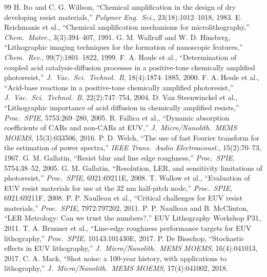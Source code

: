 \documentclass[11pt]{article}
\begin{document}
\begin{thebibliography}{99}
 H. Ito and C. G. Willson, ``Chemical amplification in the design of dry developing resist materials,'' \emph{Polymer Eng.\ Sci.}, 23(18):1012--1018, 1983.
 E. Reichmanis et al., ``Chemical amplification mechanisms for microlithography,'' \emph{Chem.\ Mater.}, 3(3):394--407, 1991.
 G. M. Wallraff and W. D. Hinsberg, ``Lithographic imaging techniques for the formation of nanoscopic features,'' \emph{Chem.\ Rev.}, 99(7):1801--1822, 1999.
 F. A. Houle et al., ``Determination of coupled acid catalysis-diffusion processes in a positive-tone chemically amplified photoresist,'' \emph{J.\ Vac.\ Sci.\ Technol.\ B}, 18(4):1874--1885, 2000.
 F. A. Houle et al., ``Acid-base reactions in a positive-tone chemically amplified photoresist,'' \emph{J.\ Vac.\ Sci.\ Technol.\ B}, 22(2):747--754, 2004.
 D. Van Steenwinckel et al., ``Lithographic importance of acid diffusion in chemically amplified resists,'' \emph{Proc.\ SPIE}, 5753:269--280, 2005.
 R. Fallica et al., ``Dynamic absorption coefficients of CARs and non-CARs at EUV,'' \emph{J.\ Micro/Nanolith.\ MEMS MOEMS}, 15(3):033506, 2016.
 P. D. Welch, ``The use of fast Fourier transform for the estimation of power spectra,'' \emph{IEEE Trans.\ Audio Electroacoust.}, 15(2):70--73, 1967.
 G. M. Gallatin, ``Resist blur and line edge roughness,'' \emph{Proc.\ SPIE}, 5754:38--52, 2005.
 G. M. Gallatin, ``Resolution, LER, and sensitivity limitations of photoresist,'' \emph{Proc.\ SPIE}, 6921:69211E, 2008.
 T. Wallow et al., ``Evaluation of EUV resist materials for use at the 32 nm half-pitch node,'' \emph{Proc.\ SPIE}, 6921:69211F, 2008.
 P. P. Naulleau et al., ``Critical challenges for EUV resist materials,'' \emph{Proc.\ SPIE}, 7972:797202, 2011.
 P. P. Naulleau and B. McClinton, ``LER Metrology: Can we trust the numbers?,'' EUV Lithography Workshop P31, 2011.
 T. A. Brunner et al., ``Line-edge roughness performance targets for EUV lithography,'' \emph{Proc.\ SPIE}, 10143:101430E, 2017.
 P. De Bisschop, ``Stochastic effects in EUV lithography,'' \emph{J.\ Micro/Nanolith.\ MEMS MOEMS}, 16(4):041013, 2017.
 C. A. Mack, ``Shot noise: a 100-year history, with applications to lithography,'' \emph{J.\ Micro/Nanolith.\ MEMS MOEMS}, 17(4):041002, 2018.

\end{thebibliography}
\end{document}
